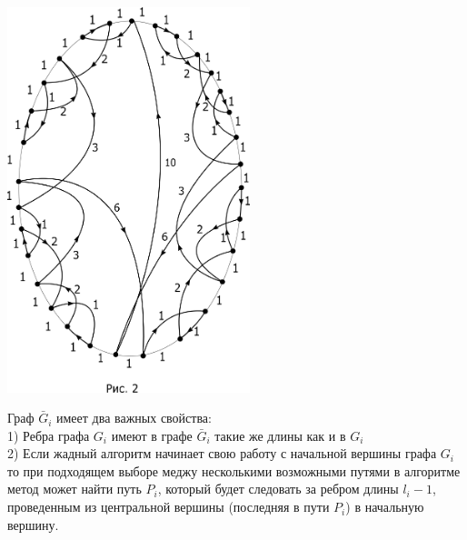 \documentclass[a4paper, 14pt]{extarticle}
\begin{document}
\begin{center}
\includegraphics[width=200pt]{ris2.png}
\end{center}


Граф $\bar G_i$ имеет два важных свойства:\\
1) Ребра графа $G_i$ имеют в графе $\bar G_i$ такие же длины как и в $G_i$ \\
2) Если жадный алгоритм начинает свою работу с начальной вершины графа  $G_i$ то при подходящем выборе меджу несколькими возможными путями в алгоритме метод может найти путь $P_i$, который будет следовать за ребром длины $l_i-1$, проведенным из центральной вершины (последняя в пути $P_i$) в начальную вершину.
\end{document}

